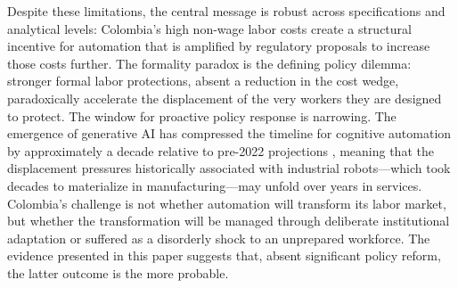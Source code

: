 \documentclass{article}
\begin{document}
Despite these limitations, the central message is robust across specifications and analytical levels: Colombia's high non-wage labor costs create a structural incentive for automation that is amplified by regulatory proposals to increase those costs further. The formality paradox is the defining policy dilemma: stronger formal labor protections, absent a reduction in the cost wedge, paradoxically accelerate the displacement of the very workers they are designed to protect. The window for proactive policy response is narrowing. The emergence of generative AI has compressed the timeline for cognitive automation by approximately a decade relative to pre-2022 projections \cite{wef2025}, meaning that the displacement pressures historically associated with industrial robots---which took decades to materialize in manufacturing---may unfold over years in services. Colombia's challenge is not whether automation will transform its labor market, but whether the transformation will be managed through deliberate institutional adaptation or suffered as a disorderly shock to an unprepared workforce. The evidence presented in this paper suggests that, absent significant policy reform, the latter outcome is the more probable.


% 
\end{document}

